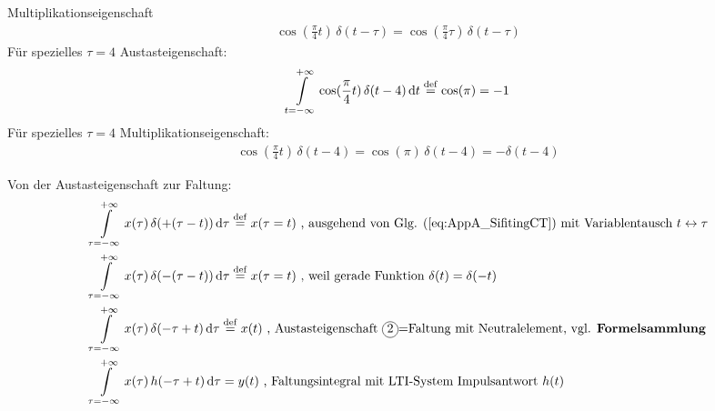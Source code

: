 Multiplikationseigenschaft
\begin{align}
\cos(\frac{\pi}{4} t) \, \delta(t-\tau) = \cos(\frac{\pi}{4} \tau) \, \delta(t-\tau)
\end{align}
Für spezielles $\tau=4$ Austasteigenschaft:
\begin{align}
\int\limits_{t=-\infty}^{+\infty} \cos(\frac{\pi}{4} t) \, \delta(t-4) \, \mathrm{d} t \stackrel{\mathrm{def}}=\cos(\pi) = -1
\end{align}
%
Für spezielles $\tau=4$ Multiplikationseigenschaft:
\begin{align}
\cos(\frac{\pi}{4} t) \, \delta(t-4) = \cos(\pi) \, \delta(t-4) = -\delta(t-4)
\end{align}

\begin{mdframed}
Von der Austasteigenschaft  zur Faltung:
\begin{align}
&\int\limits_{\tau=-\infty}^{+\infty} x(\tau) \, \delta(+(\tau-t)) \, \fsd \tau \stackrel{\mathrm{def}}= x(\tau=t)\text{ , ausgehend von \eq{eq:AppA_SifitingCT} mit Variablentausch } t \leftrightarrow \tau\nonumber\\
&\int\limits_{\tau=-\infty}^{+\infty} x(\tau) \, \delta(-(\tau-t)) \, \fsd \tau \stackrel{\mathrm{def}}= x(\tau=t)\text{ , weil gerade Funktion }\delta(t)=\delta(-t)\nonumber\\
&\int\limits_{\tau=-\infty}^{+\infty} x(\tau) \, \delta(-\tau+t) \, \fsd \tau \stackrel{\mathrm{def}}= x(t) \text{ , Austasteigenschaft \circled{2}=Faltung mit Neutralelement, vgl. \textbf{Formelsammlung}}\nonumber\\
&\int\limits_{\tau=-\infty}^{+\infty} x(\tau) \, h(-\tau+t) \, \fsd \tau = y(t) \text{ , Faltungsintegral mit LTI-System Impulsantwort } h(t)
\end{align}
\end{mdframed}



%
\newpage
